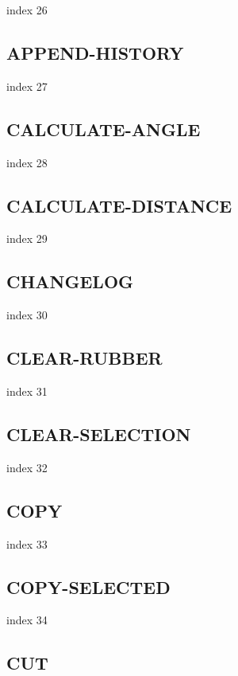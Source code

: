 \documentclass[a4paper]{report}
\begin{document}
{{{{{{{{{{{{{index 26

\subsection{APPEND-HISTORY}

index 27

\subsection{CALCULATE-ANGLE}

index 28

\subsection{CALCULATE-DISTANCE}

index 29

\subsection{CHANGELOG}

index 30

\subsection{CLEAR-RUBBER}

index 31

\subsection{CLEAR-SELECTION}

index 32

\subsection{COPY}

index 33

\subsection{COPY-SELECTED}

index 34

\subsection{CUT}

}}}}}}}}}}}}}
\end{document}
